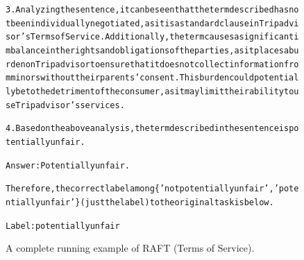 \begin{figure}[t]
{{\begin{alltt}
3. Analyzing the sentence, it can be seen that the term described has not been individually negotiated, as it is a standard clause in Tripadvisor's Terms of Service. Additionally, the term causes a significant imbalance in the rights and obligations of the parties, as it places a burden on Tripadvisor to ensure that it does not collect information from minors without their parents' consent. This burden could potentially be to the detriment of the consumer, as it may limit their ability to use Tripadvisor's services.

4. Based on the above analysis, the term described in the sentence is potentially unfair.

Answer: Potentially unfair.

Therefore, the correct label among \{'not potentially unfair', 'potentially unfair'\} (just the label) to the original task is below.

Label: potentially unfair
\end{alltt}
}}
\caption{A complete running example of RAFT (Terms of Service).}
\label{fig:raft_subset=terms_of_service_example}
\end{figure}
